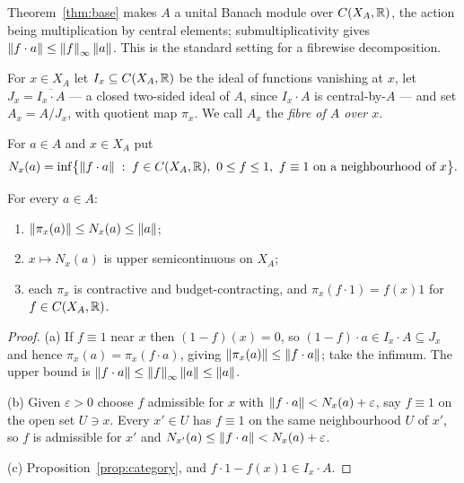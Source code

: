 Theorem~\ref{thm:base} makes $A$ a unital Banach module over $C(X_A,\mathbb{R})$, the
action being multiplication by central elements; submultiplicativity gives
$\left\lVert f\cdot a\right\rVert\le\left\lVert f\right\rVert_\infty\left\lVert a\right\rVert$.  This is the standard setting for a
fibrewise decomposition.

\begin{definition}[Fibres]\label{def:fibres}
For $x\in X_A$ let $I_x\subseteq C(X_A,\mathbb{R})$ be the ideal of functions
vanishing at $x$, let $J_x=\overline{I_x\cdot A}$ --- a closed two-sided ideal
of $A$, since $I_x\cdot A$ is central-by-$A$ --- and set $A_x=A/J_x$, with
quotient map $\pi_x$.  We call $A_x$ the \emph{fibre of $A$ over $x$}.
\end{definition}

\begin{definition}\label{def:local-norm}
For $a\in A$ and $x\in X_A$ put
\[
  N_x(a)=\inf\bigl\{\left\lVert f\cdot a\right\rVert\;:\;f\in C(X_A,\mathbb{R}),\ 0\le f\le1,\
  f\equiv1\ \text{on a neighbourhood of }x\bigr\}.
\]
\end{definition}

\begin{proposition}\label{prop:usc-field}
For every $a\in A$:
\begin{enumerate}
\item[(a)] $\left\lVert\pi_x(a)\right\rVert\le N_x(a)\le\left\lVert a\right\rVert$;
\item[(b)] $x\mapsto N_x(a)$ is upper semicontinuous on $X_A$;
\item[(c)] each $\pi_x$ is contractive and budget-contracting, and
  $\pi_x(f\cdot1)=f(x)1$ for $f\in C(X_A,\mathbb{R})$.
\end{enumerate}
\end{proposition}

\begin{proof}
(a) If $f\equiv1$ near $x$ then $(1-f)(x)=0$, so $(1-f)\cdot a\in I_x\cdot A\subseteq J_x$
and hence $\pi_x(a)=\pi_x(f\cdot a)$, giving
$\left\lVert\pi_x(a)\right\rVert\le\left\lVert f\cdot a\right\rVert$; take the infimum.  The upper bound is
$\left\lVert f\cdot a\right\rVert\le\left\lVert f\right\rVert_\infty\left\lVert a\right\rVert\le\left\lVert a\right\rVert$.

(b) Given $\varepsilon>0$ choose $f$ admissible for $x$ with
$\left\lVert f\cdot a\right\rVert<N_x(a)+\varepsilon$, say $f\equiv1$ on the open set $U\ni x$.
Every $x'\in U$ has $f\equiv1$ on the same neighbourhood $U$ of $x'$, so $f$ is
admissible for $x'$ and $N_{x'}(a)\le\left\lVert f\cdot a\right\rVert<N_x(a)+\varepsilon$.

(c) Proposition~\ref{prop:category}, and $f\cdot1-f(x)1\in I_x\cdot A$.
\end{proof}

